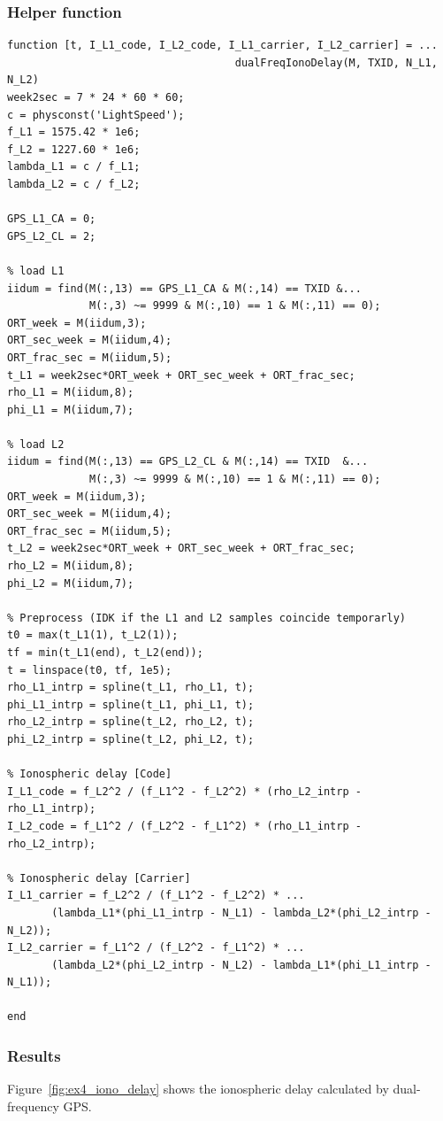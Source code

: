 \subsubsection{Helper function}

\begin{lstlisting}
function [t, I_L1_code, I_L2_code, I_L1_carrier, I_L2_carrier] = ...
                                    dualFreqIonoDelay(M, TXID, N_L1, N_L2)
week2sec = 7 * 24 * 60 * 60;
c = physconst('LightSpeed');
f_L1 = 1575.42 * 1e6;
f_L2 = 1227.60 * 1e6;
lambda_L1 = c / f_L1;
lambda_L2 = c / f_L2;

GPS_L1_CA = 0;
GPS_L2_CL = 2;

% load L1
iidum = find(M(:,13) == GPS_L1_CA & M(:,14) == TXID &...
             M(:,3) ~= 9999 & M(:,10) == 1 & M(:,11) == 0);
ORT_week = M(iidum,3);
ORT_sec_week = M(iidum,4);
ORT_frac_sec = M(iidum,5);
t_L1 = week2sec*ORT_week + ORT_sec_week + ORT_frac_sec;
rho_L1 = M(iidum,8);
phi_L1 = M(iidum,7);

% load L2
iidum = find(M(:,13) == GPS_L2_CL & M(:,14) == TXID  &...
             M(:,3) ~= 9999 & M(:,10) == 1 & M(:,11) == 0);
ORT_week = M(iidum,3);
ORT_sec_week = M(iidum,4);
ORT_frac_sec = M(iidum,5);
t_L2 = week2sec*ORT_week + ORT_sec_week + ORT_frac_sec;
rho_L2 = M(iidum,8);
phi_L2 = M(iidum,7);

% Preprocess (IDK if the L1 and L2 samples coincide temporarly)
t0 = max(t_L1(1), t_L2(1));
tf = min(t_L1(end), t_L2(end));
t = linspace(t0, tf, 1e5);
rho_L1_intrp = spline(t_L1, rho_L1, t);
phi_L1_intrp = spline(t_L1, phi_L1, t);
rho_L2_intrp = spline(t_L2, rho_L2, t);
phi_L2_intrp = spline(t_L2, phi_L2, t);

% Ionospheric delay [Code]
I_L1_code = f_L2^2 / (f_L1^2 - f_L2^2) * (rho_L2_intrp - rho_L1_intrp);
I_L2_code = f_L1^2 / (f_L2^2 - f_L1^2) * (rho_L1_intrp - rho_L2_intrp);

% Ionospheric delay [Carrier]
I_L1_carrier = f_L2^2 / (f_L1^2 - f_L2^2) * ...
       (lambda_L1*(phi_L1_intrp - N_L1) - lambda_L2*(phi_L2_intrp - N_L2));
I_L2_carrier = f_L1^2 / (f_L2^2 - f_L1^2) * ...
       (lambda_L2*(phi_L2_intrp - N_L2) - lambda_L1*(phi_L1_intrp - N_L1));

end
\end{lstlisting}

\subsubsection{Results}

Figure~\ref{fig:ex4_iono_delay} shows the ionospheric delay calculated by
dual-frequency GPS.

